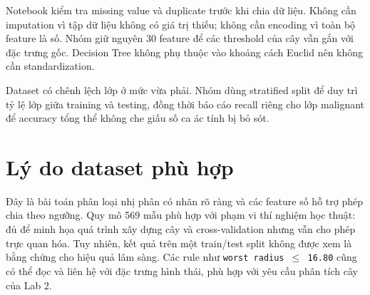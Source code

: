 Notebook kiểm tra missing value và duplicate trước khi chia dữ liệu. Không cần
imputation vì tập dữ liệu không có giá trị thiếu; không cần encoding vì toàn bộ
feature là số. Nhóm giữ nguyên 30 feature để các threshold của cây vẫn gắn với
đặc trưng gốc. Decision Tree không phụ thuộc vào khoảng cách Euclid nên không
cần standardization.

Dataset có chênh lệch lớp ở mức vừa phải. Nhóm dùng stratified split để duy trì
tỷ lệ lớp giữa training và testing, đồng thời báo cáo recall riêng cho lớp
malignant để accuracy tổng thể không che giấu số ca ác tính bị bỏ sót.

\section{Lý do dataset phù hợp}

Đây là bài toán phân loại nhị phân có nhãn rõ ràng và các feature số hỗ trợ
phép chia theo ngưỡng. Quy mô 569 mẫu phù hợp với phạm vi thí nghiệm học thuật:
đủ để minh họa quá trình xây dựng cây và cross-validation nhưng vẫn cho phép
trực quan hóa. Tuy nhiên, kết quả trên một train/test split không được xem là
bằng chứng cho hiệu quả lâm sàng. Các rule như
\texttt{worst radius $\leq$ 16.80} cũng có thể đọc và liên hệ với đặc trưng
hình thái, phù hợp với yêu cầu phân tích cây của Lab 2.
